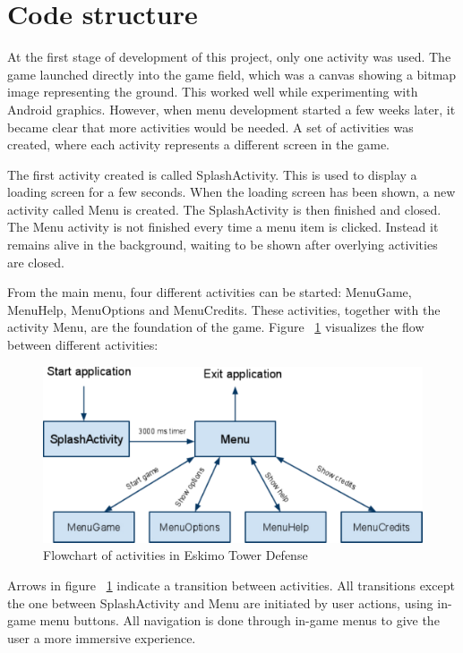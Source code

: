 \section{Code structure}

At the first stage of development of this project, only one activity was used. The game launched directly into the game field, which was a canvas showing a bitmap image representing the ground. This worked well while experimenting with Android graphics. However, when menu development started a few weeks later, it became clear that more activities would be needed. A set of activities was created, where each activity represents a different screen in the game.

The first activity created is called SplashActivity. This is used to display a loading screen for a few seconds. When the loading screen has been shown, a new activity called Menu is created. The SplashActivity is then finished and closed. The Menu activity is not finished every time a menu item is clicked. Instead it remains alive in the background, waiting to be shown after overlying activities are closed.

From the main menu, four different activities can be started: MenuGame, MenuHelp, MenuOptions and MenuCredits. These activities, together with the activity Menu, are the foundation of the game. Figure ~\ref{fig:codestructureActivities} visualizes the flow between different activities: 

\begin{figure}[here]
\begin{center}
\includegraphics[scale=0.6]{pics/chapters/chapter4/codestructure}
\end{center}
\caption{Flowchart of activities in Eskimo Tower Defense}
\label{fig:codestructureActivities}
\end{figure}

Arrows in figure ~\ref{fig:codestructureActivities} indicate a transition between activities. All transitions except the one between SplashActivity and Menu are initiated by user actions, using in-game menu buttons. All navigation is done through in-game menus to give the user a more immersive experience.

